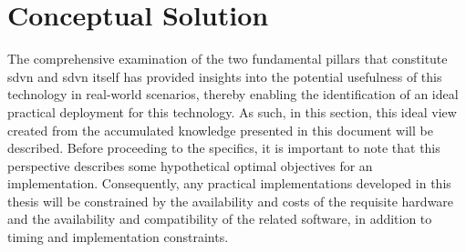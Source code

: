 \chapter{Conceptual Solution}
\label{cha:conceptual_solution}

The comprehensive examination of the two fundamental pillars that constitute \gls{sdvn} and \gls{sdvn} itself has provided insights into the potential usefulness of this technology in real-world scenarios, thereby enabling the identification of an ideal practical deployment for this technology. As such, in this section, this ideal view created from the accumulated knowledge presented in this document will be described.
Before proceeding to the specifics, it is important to note that this perspective describes some hypothetical optimal objectives for an implementation. Consequently, any practical implementations developed in this thesis will be constrained by the availability and costs of the requisite hardware and the availability and compatibility of the related software, in addition to timing and implementation constraints.    

